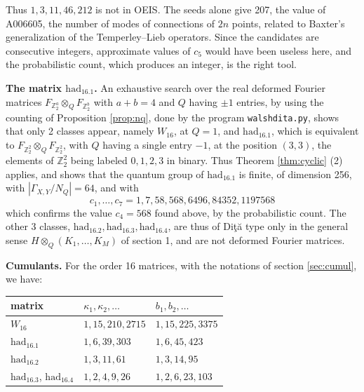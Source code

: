 \documentclass[11pt]{amsart}
\begin{document}
\medskip

\noindent Thus $1,3,11,46,212$ is not in OEIS. The seeds alone give 207, the value of A006605, the number of modes of connections of $2n$ points, related to Baxter's generalization of the Temperley--Lieb operators. Since the candidates are consecutive integers, approximate values of $c_5$ would have been useless here, and the probabilistic count, which produces an integer, is the right tool.

\medskip

\noindent\textbf{The matrix $\mathrm{had}_{16.1}$.} An exhaustive search over the real deformed Fourier matrices $F_{\mathbb Z_2^a}\otimes_QF_{\mathbb Z_2^b}$ with $a+b=4$ and $Q$ having $\pm1$ entries, by using the counting of Proposition \ref{prop:nq}, done by the program \texttt{walshdita.py}, shows that only 2 classes appear, namely $W_{16}$, at $Q=1$, and $\mathrm{had}_{16.1}$, which is equivalent to $F_{\mathbb Z_2^2}\otimes_QF_{\mathbb Z_2^2}$, with $Q$ having a single entry $-1$, at the position $(3,3)$, the elements of $\mathbb Z_2^2$ being labeled $0,1,2,3$ in binary. Thus Theorem \ref{thm:cyclic} (2) applies, and shows that the quantum group of $\mathrm{had}_{16.1}$ is finite, of dimension 256, with $|\Gamma_{X,Y}/N_Q|=64$, and with
$$c_1,\ldots,c_7=1,7,58,568,6496,84352,1197568$$
which confirms the value $c_4=568$ found above, by the probabilistic count. The other 3 classes, $\mathrm{had}_{16.2},\mathrm{had}_{16.3},\mathrm{had}_{16.4}$, are thus of Di\c t\u a type only in the general sense $H\otimes_Q(K_1,\ldots,K_M)$ of section 1, and are not deformed Fourier matrices.

\medskip

\noindent\textbf{Cumulants.} For the order 16 matrices, with the notations of section \ref{sec:cumul}, we have:

\medskip

\begin{center}
\begin{tabular}{lll}
\toprule
matrix & $\kappa_1,\kappa_2,\ldots$ & $b_1,b_2,\ldots$\\
\midrule
$W_{16}$ & $1,15,210,2715$ & $1,15,225,3375$\\
$\mathrm{had}_{16.1}$ & $1,6,39,303$ & $1,6,45,423$\\
$\mathrm{had}_{16.2}$ & $1,3,11,61$ & $1,3,14,95$\\
$\mathrm{had}_{16.3}$, $\mathrm{had}_{16.4}$ & $1,2,4,9,26$ & $1,2,6,23,103$\\
\bottomrule
\end{tabular}
\end{center}
\end{document}

